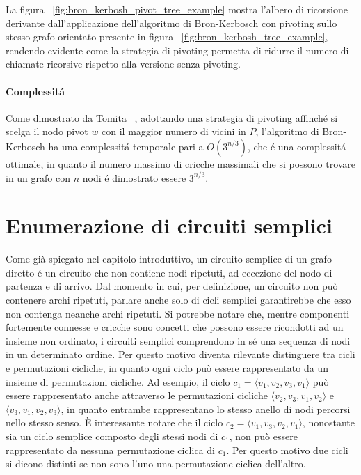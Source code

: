 La figura ~\ref{fig:bron_kerbosh_pivot_tree_example} mostra l'albero di ricorsione derivante dall'applicazione
dell'algoritmo di Bron-Kerbosch con pivoting sullo stesso grafo orientato presente in figura
~\ref{fig:bron_kerbosh_tree_example}, rendendo evidente come la strategia di pivoting permetta di ridurre il numero
di chiamate ricorsive rispetto alla versione senza pivoting.

\paragraph{Complessit\'a}
Come dimostrato da Tomita ~\cite{TOMITA200628}, adottando una strategia di pivoting affinch\'e si scelga il nodo pivot
$w$ con il maggior numero di vicini in $P$, l'algoritmo di Bron-Kerbosch ha una complessit\'a temporale pari a
$O(3^{n/3})$, che \'e una complessit\'a ottimale, in quanto il numero massimo di cricche massimali che si possono
trovare in un grafo con $n$ nodi \'e dimostrato essere $3^{n/3}$.

\section{Enumerazione di circuiti semplici}\label{sec:enumerazione-di-cicli}

Come gi\`a spiegato nel capitolo introduttivo, un circuito semplice di un grafo diretto \'e un circuito
che non contiene nodi ripetuti, ad eccezione del nodo di partenza e di arrivo.
Dal momento in cui, per definizione, un circuito non pu\`o contenere archi ripetuti, parlare anche solo di cicli
semplici garantirebbe che esso non contenga neanche archi ripetuti.
Si potrebbe notare che, mentre componenti fortemente connesse e cricche sono concetti che possono essere
ricondotti ad un insieme non ordinato, i circuiti semplici comprendono in s\'e una sequenza di nodi in un determinato
ordine.
Per questo motivo diventa rilevante distinguere tra cicli e permutazioni cicliche, in quanto ogni ciclo
pu\`o essere rappresentato da un insieme di permutazioni cicliche.
Ad esempio, il ciclo $c_1 = \langle v_1, v_2, v_3, v_1 \rangle$ pu\`o essere rappresentato anche attraverso le
permutazioni cicliche $\langle v_2, v_3, v_1, v_2 \rangle$ e $\langle v_3, v_1, v_2, v_3 \rangle$, in quanto entrambe
rappresentano lo stesso anello di nodi percorsi nello stesso senso. \newline
\`E interessante notare che il ciclo $c_2 = \langle v_1, v_3, v_2, v_1 \rangle$, nonostante sia un ciclo semplice
composto degli stessi nodi di $c_1$, non pu\`o essere rappresentato da nessuna permutazione ciclica di $c_1$.
Per questo motivo due cicli si dicono distinti se non sono l'uno una permutazione ciclica dell'altro. \newline

